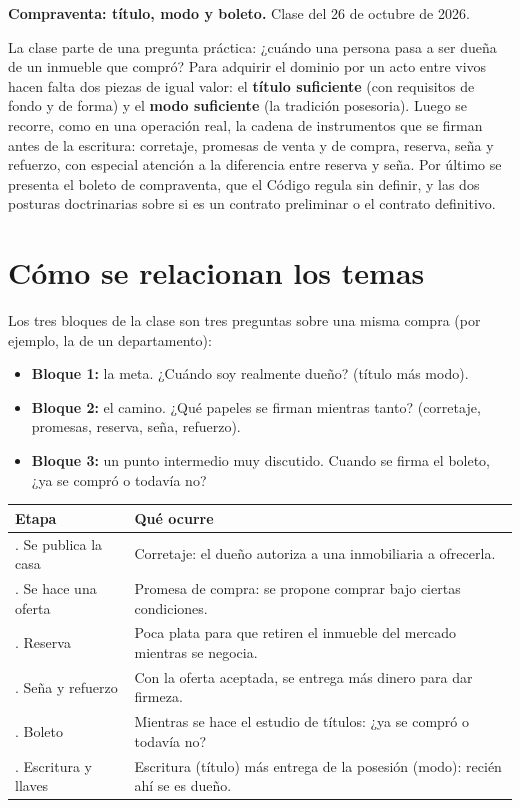 \documentclass[12pt,oneside]{book}
\begin{document}
\textbf{Compraventa: título, modo y boleto.} Clase del 26 de octubre de 2026.

La clase parte de una pregunta práctica: ¿cuándo una persona pasa a ser dueña de un inmueble que compró? Para adquirir el dominio por un acto entre vivos hacen falta dos piezas de igual valor: el \textbf{título suficiente} (con requisitos de fondo y de forma) y el \textbf{modo suficiente} (la tradición posesoria). Luego se recorre, como en una operación real, la cadena de instrumentos que se firman antes de la escritura: corretaje, promesas de venta y de compra, reserva, seña y refuerzo, con especial atención a la diferencia entre reserva y seña. Por último se presenta el boleto de compraventa, que el Código regula sin definir, y las dos posturas doctrinarias sobre si es un contrato preliminar o el contrato definitivo.

\section*{Cómo se relacionan los temas}

Los tres bloques de la clase son tres preguntas sobre una misma compra (por ejemplo, la de un departamento):

\begin{itemize}
    \item \textbf{Bloque 1:} la meta. ¿Cuándo soy realmente dueño? (título más modo).
    \item \textbf{Bloque 2:} el camino. ¿Qué papeles se firman mientras tanto? (corretaje, promesas, reserva, seña, refuerzo).
    \item \textbf{Bloque 3:} un punto intermedio muy discutido. Cuando se firma el boleto, ¿ya se compró o todavía no?
\end{itemize}

\begin{table}[H]
\centering
\small
\begin{tabularx}{\textwidth}{@{}>{\raggedright\arraybackslash}p{}>{\raggedright\arraybackslash}X@{}}
\toprule
\textbf{Etapa} & \textbf{Qué ocurre} \\
\midrule
1. Se publica la casa & Corretaje: el dueño autoriza a una inmobiliaria a ofrecerla. \\
2. Se hace una oferta & Promesa de compra: se propone comprar bajo ciertas condiciones. \\
3. Reserva & Poca plata para que retiren el inmueble del mercado mientras se negocia. \\
4. Seña y refuerzo & Con la oferta aceptada, se entrega más dinero para dar firmeza. \\
5. Boleto & Mientras se hace el estudio de títulos: ¿ya se compró o todavía no? \\
6. Escritura y llaves & Escritura (título) más entrega de la posesión (modo): recién ahí se es dueño. \\
\bottomrule
\end{tabularx}
\end{table}
\end{document}
